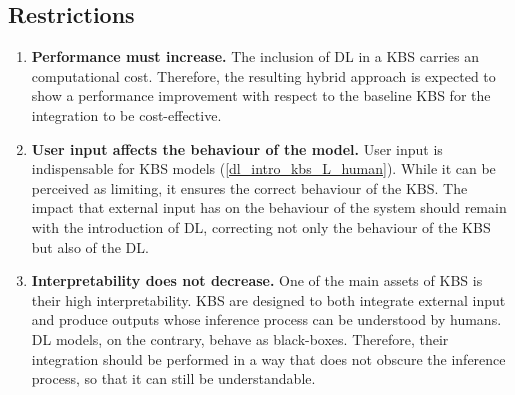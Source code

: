 \subsection{Restrictions}
\begin{enumerate} [start=1,label={\bfseries R\arabic*.}]
    \item \textbf{Performance must increase.} \label{dlinstrokbs_R_performance} The inclusion of DL in a KBS carries an computational cost. Therefore, the resulting hybrid approach is expected to show a performance improvement with respect to the baseline KBS for the integration to be cost-effective. 
    
    \item \textbf{User input affects the behaviour of the model.}\label{dlintrokbs_R_user} User input is indispensable for KBS models (\ref{dl_intro_kbs_L_human}). While it can be perceived as limiting, it ensures the correct behaviour of the KBS. The impact that external input has on the behaviour of the system should remain with the introduction of DL, correcting not only the behaviour of the KBS but also of the DL.
    
    \item \textbf{Interpretability does not decrease.}\label{dlintrokbs_LR_interpretability} One of the main assets of KBS is their high interpretability. KBS are designed to both integrate external input and produce outputs whose inference process can be understood by humans. DL models, on the contrary, behave as black-boxes. Therefore, their integration should be performed in a way that does not obscure the inference process, so that it can still be understandable.
    
\end{enumerate}
